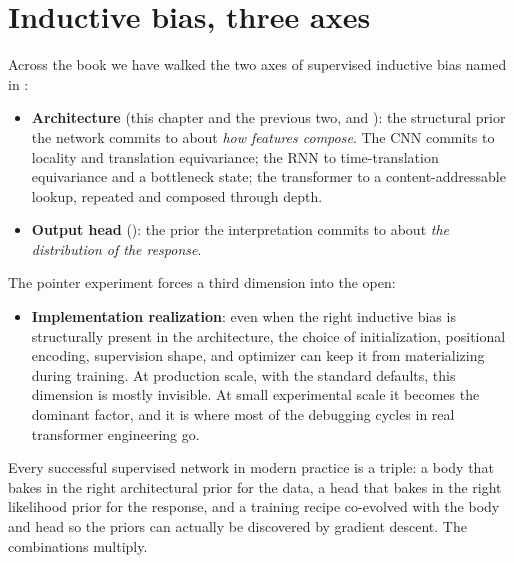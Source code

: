 
\section{Inductive bias, three axes}\label{sec:three-axes}

Across the book we have walked the two axes of supervised inductive bias
named in :

\begin{itemize}
\item \textbf{Architecture} (this chapter and the previous two,
   and ): the structural prior the network
  commits to about \emph{how features compose}. The CNN commits to
  locality and translation equivariance; the RNN to time-translation
  equivariance and a bottleneck state; the transformer to a
  content-addressable lookup, repeated and composed through depth.
\item \textbf{Output head} (): the prior the
  interpretation commits to about \emph{the distribution of the response}.
\end{itemize}

The pointer experiment forces a third dimension into the open:

\begin{itemize}
\item \textbf{Implementation realization}: even when the right inductive
  bias is structurally present in the architecture, the choice of
  initialization, positional encoding, supervision shape, and optimizer
  can keep it from materializing during training. At production scale,
  with the standard defaults, this dimension is mostly invisible. At
  small experimental scale it becomes the dominant factor, and it is
  where most of the debugging cycles in real transformer engineering go.
\end{itemize}

Every successful supervised network in modern practice is a triple: a
body that bakes in the right architectural prior for the data, a head
that bakes in the right likelihood prior for the response, and a training
recipe co-evolved with the body and head so the priors can actually be
discovered by gradient descent. The combinations multiply.

